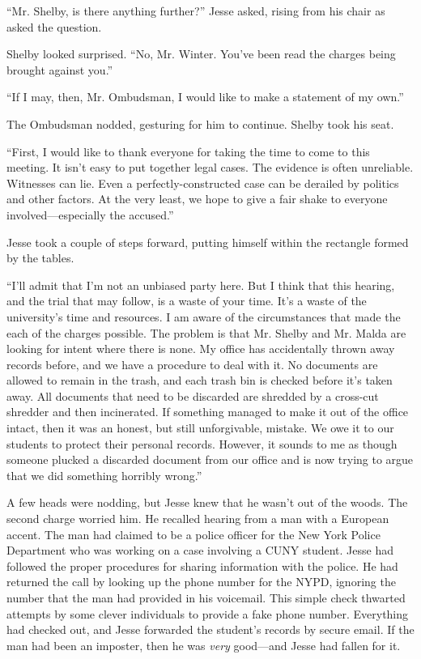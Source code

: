 \documentclass[12pt]{book}
\begin{document}
``Mr. Shelby, is there anything further?'' Jesse asked, rising from his chair as asked the question.

Shelby looked surprised.  ``No, Mr. Winter.  You've been read the charges being brought against you.''

``If I may, then, Mr. Ombudsman, I would like to make a statement of my own.''

The Ombudsman nodded, gesturing for him to continue.  Shelby took his seat.

``First, I would like to thank everyone for taking the time to come to this meeting.  It isn't easy to put together legal cases.  The evidence is often unreliable.  Witnesses can lie.  Even a perfectly-constructed case can be derailed by politics and other factors.  At the very least, we hope to give a fair shake to everyone involved---especially the accused.''

Jesse took a couple of steps forward, putting himself within the rectangle formed by the tables.

``I'll admit that I'm not an unbiased party here.  But I think that this hearing, and the trial that may follow, is a waste of your time.  It's a waste of the university's time and resources.  I am aware of the circumstances that made the each of the charges possible.  The problem is that Mr. Shelby and Mr. Malda are looking for intent where there is none.  My office has accidentally thrown away records before, and we have a procedure to deal with it.  No documents are allowed to remain in the trash, and each trash bin is checked before it's taken away.  All documents that need to be discarded are shredded by a cross-cut shredder and then incinerated.  If something managed to make it out of the office intact, then it was an honest, but still unforgivable, mistake.  We owe it to our students to protect their personal records.  However, it sounds to me as though someone plucked a discarded document from our office and is now trying to argue that we did something horribly wrong.''

A few heads were nodding, but Jesse knew that he wasn't out of the woods.  The second charge worried him.  He recalled hearing from a man with a European accent.  The man had claimed to be a police officer for the New York Police Department who was working on a case involving a CUNY student.  Jesse had followed the proper procedures for sharing information with the police.  He had returned the call by looking up the phone number for the NYPD, ignoring the number that the man had provided in his voicemail.  This simple check thwarted attempts by some clever individuals to provide a fake phone number.  Everything had checked out, and Jesse forwarded the student's records by secure email.  If the man had been an imposter, then he was \emph{very} good---and Jesse had fallen for it.
\end{document}
